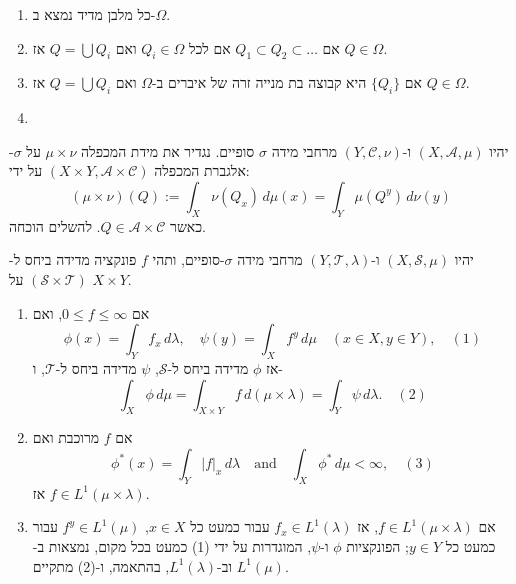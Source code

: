 \documentclass{tstextbook}
\begin{document}
\begin{enumerate}
  \item כל מלבן מדיד נמצא ב-\(\Omega\). 


  \item אם \(Q_{1} \subset Q_{2} \subset \dots\) אם לכל \(Q_{i}\in \Omega\) ואם \(Q=\bigcup Q_{i}\) אז \(Q \in \Omega\). 


  \item אם \(\{ Q_{i} \}\) היא קבוצה בת מנייה זרה של איברים ב-\(\Omega\) ואם \(Q=\bigcup Q_{i}\) אז \(Q \in \Omega\). 


  \item 
\end{enumerate}
\begin{definition}
יהיו \((X, \mathcal{A}, \mu)\) ו-\((Y, \mathcal{C}, \nu)\) מרחבי מידה \(\sigma\) סופיים. נגדיר את מידת המכפלה \(\mu \times \nu\) על \(\sigma\)-אלגברת המכפלה \(\left( X\times Y,\mathcal{A} \times \mathcal{C} \right)\) על ידי:
$$(\mu \times \nu)(Q) := \int_X \nu(Q_x) \, d\mu(x) = \int_Y \mu(Q^y) \, d\nu(y)$$
כאשר \(Q \in \mathcal{A} \times \mathcal{C}\).
להשלים הוכחה.

\end{definition}
\begin{theorem}[פוביני]
יהיו \((X, \mathcal{S}, \mu)\) ו-\((Y, \mathcal{T}, \lambda)\) מרחבי מידה \(\sigma\)-סופיים, ותהי \(f\) פונקציה מדידה ביחס ל- \((\mathcal{S} \times \mathcal{T})\) על \(X \times Y\).

  \begin{enumerate}
    \item אם \(0 \le f \le \infty\), ואם 
$$\phi(x) = \int_Y f_x \, d\lambda, \quad \psi(y) = \int_X f^y \, d\mu \quad (x \in X, y \in Y), \quad (1)$$
אז \(\phi\) מדידה ביחס ל-\(\mathcal{S}\), \(\psi\) מדידה ביחס ל-\(\mathcal{T}\), ו-
$$\int_X \phi \, d\mu = \int_{X \times Y} f \, d(\mu \times \lambda) = \int_Y \psi \, d\lambda. \quad (2)$$


    \item אם \(f\) מרוכבת ואם 
$$\phi^*(x) = \int_Y |f|_x \, d\lambda \quad \text{and} \quad \int_X \phi^* \, d\mu < \infty, \quad (3)$$
אז \(f \in L^1(\mu \times \lambda)\).


    \item אם \(f \in L^1(\mu \times \lambda)\), אז \(f_x \in L^1(\lambda)\) עבור כמעט כל \(x \in X\), \(f^y \in L^1(\mu)\) עבור כמעט כל \(y \in Y\); הפונקציות \(\phi\) ו-\(\psi\), המוגדרות על ידי (1) כמעט בכל מקום, נמצאות ב-\(L^1(\mu)\) וב-\(L^1(\lambda)\), בהתאמה, ו-(2) מתקיים. 


  \end{enumerate}
\end{theorem}
\end{document}
